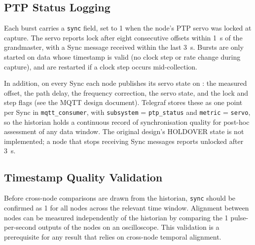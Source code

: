 \subsection{PTP Status Logging}
Each burst carries a \texttt{sync} field, set to 1 when the node's PTP servo was locked at capture. The servo reports lock after eight consecutive offsets within 1~\textmu s of the grandmaster, with a Sync message received within the last 3~s. Bursts are only started on data whose timestamp is valid (no clock step or rate change during capture), and are restarted if a clock step occurs mid-collection.

In addition, on every Sync each node publishes its servo state on : the measured offset, the path delay, the frequency correction, the servo state, and the lock and step flags (see the MQTT design document). Telegraf stores these as one point per Sync in \texttt{mqtt\_consumer}, with \texttt{subsystem} = \texttt{ptp\_status} and \texttt{metric} = \texttt{servo}, so the historian holds a continuous record of synchronisation quality for post-hoc assessment of any data window. The original design's HOLDOVER state is not implemented; a node that stops receiving Sync messages reports unlocked after 3~s.

\subsection{Timestamp Quality Validation}
Before cross-node comparisons are drawn from the historian, \texttt{sync} should be confirmed as 1 for all nodes across the relevant time window. Alignment between nodes can be measured independently of the historian by comparing the 1 pulse-per-second outputs of the nodes on an oscilloscope. This validation is a prerequisite for any result that relies on cross-node temporal alignment.
